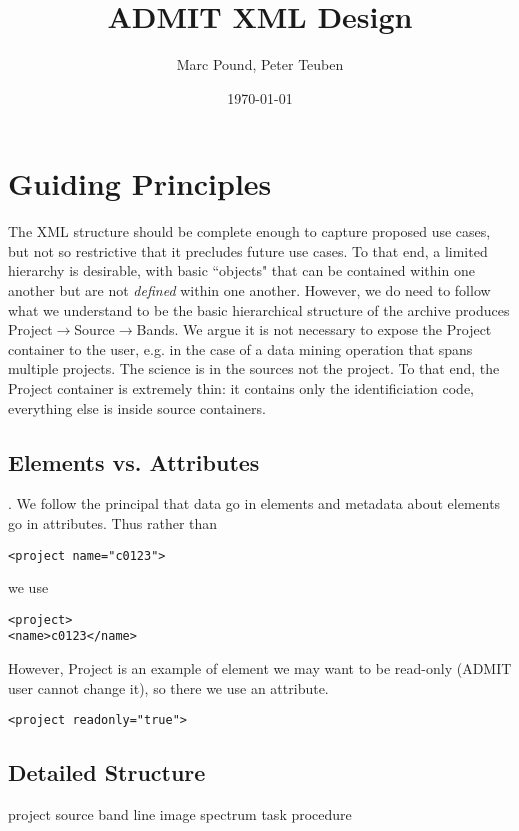 \documentclass{report}
\title{ADMIT XML Design}
\author{Marc Pound, Peter Teuben}
\date{\today}
\begin{document}
\maketitle

\section{Guiding Principles}
The XML structure should be complete enough to capture proposed use cases,
but not so restrictive that it precludes future use cases. To that end, a
limited hierarchy is desirable, with basic ``objects" that can be contained
within one another but are not {\it defined} within one another.  However, we
do need to follow what we understand to be the basic hierarchical structure
of the archive produces Project$\rightarrow$Source$\rightarrow$Bands.
We argue it is not necessary to expose the Project container to
the user, e.g. in the case of a data mining operation that spans multiple
projects. The science is in the sources not the project. To that end, the
Project container is extremely thin: it contains only the identificiation
code, everything else is inside source containers.

\subsection{Elements vs. Attributes}.  
We follow the principal that data go in elements and metadata about
elements go in attributes.   Thus rather than

\begin{verbatim}
<project name="c0123">  
\end{verbatim}

we use 

\begin{verbatim}
<project>
<name>c0123</name>
\end{verbatim}

However, Project is an example of element we may want to be read-only (ADMIT 
user cannot change it), so there we use an attribute.

\begin{verbatim}
<project readonly="true">
\end{verbatim}

\subsection{Detailed Structure}
project
    source
        band
        line 
        image
        spectrum
        task
        procedure
    
\end{document}
